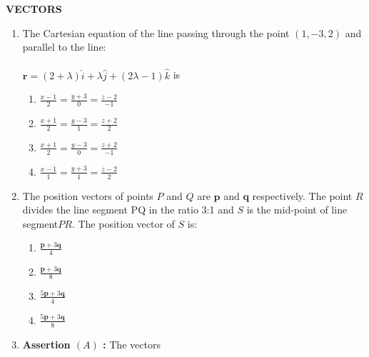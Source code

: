 \documentclass[12pt,-letter paper]{article}
\let\vec\mathbf{}
\let\vec\mathbf{}
\let\vec\mathbf{}
\providecommand{\brak}[1]{\ensuremath{\left(#1\right)}}
\begin{document}
\begin{center}                                               \textbf{VECTORS}                                                    \end{center}                                                            \begin{enumerate}
        \item
                The Cartesian equation of the line passing through the point $\brak{1,-3,2}$ and parallel to the line:                                           \\ \\                                                                  $\vec{r} = $\brak{2+\lambda}$ \hat{i} + \lambda \hat{j}
+ $\brak{2\lambda-1}$ \hat{k}$ is
      \begin{enumerate}[label={$\brak{\Alph*}$}]                            \item  $ \frac{x-1}{2} = \frac{y+3}{0} = \frac{z-2}{-1}$                \item  $\frac{x+1}{2} = \frac{y-3}{1} = \frac{z+2}{2}$                  \item $ \frac{x+1}{2} = \frac{y-3}{0} = \frac{z+2}{-1}$                 \item  $ \frac{x-1}{1} = \frac{y+3}{1} = \frac{z-2}{2}$             \end{enumerate}                                                             \item                                                                           The position vectors of points $P$ and $ Q $ are \(\vec{p} \) and \( \vec{q} \) respectively. The point \( R \) divides the line segment  PQ  in the ratio 3:1  and $S$ is the mid-point of  line segment$ PR$. The position vector of $ S $ is:                                     
                \begin{enumerate}[label={$\brak{\Alph*}$}]                      \item $\frac{\vec{p} + 3\vec{q}}{4}$                                    \item $\frac{\vec{p} + 3\vec{q}}{8}$
        \item $\frac{5\vec{p} + 3\vec{q}}{4}$
        \item $\frac{5\vec{p} + 3\vec{q}}{8}$
    \end{enumerate}                                                          \item
    \textbf{Assertion $\brak{A}$ :} The vectors \\ \\

\end{enumerate}
\end{document}
